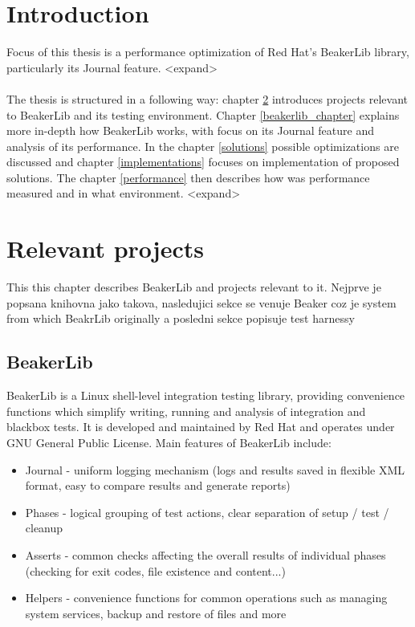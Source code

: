 
\chapter{Introduction}

Focus of this thesis is a performance optimization of Red Hat's BeakerLib library, particularly its Journal feature. <expand>
\\
\\
The thesis is structured in a following way: chapter \ref{relevant_projects} introduces projects relevant to BeakerLib and its testing environment. Chapter \ref{beakerlib_chapter} explains more in-depth how BeakerLib works, with focus on its Journal feature and analysis of its performance. In the chapter \ref{solutions} possible optimizations are discussed and chapter \ref{implementations} focuses on implementation of proposed solutions. The chapter \ref{performance} then describes how was performance measured and in what environment. <expand>

\chapter{Relevant projects}
\label{relevant_projects}

This this chapter describes BeakerLib and projects relevant to it. Nejprve je popsana knihovna jako takova, nasledujici sekce se venuje Beaker coz je system from which BeakrLib originally  a posledni sekce popisuje test harnessy

\section{BeakerLib}

BeakerLib is a Linux shell-level integration testing library, providing convenience functions which simplify writing, running and analysis of integration and blackbox tests. \cite{beakerlib_wiki}
It is developed and maintained by Red Hat and operates under GNU General Public License.
Main features of BeakerLib include:
\begin{itemize}
\item Journal - uniform logging mechanism (logs and results saved in flexible XML format, easy to compare results and generate reports)
\item Phases - logical grouping of test actions, clear separation of setup / test / cleanup
\item Asserts - common checks affecting the overall results of individual phases (checking for exit codes, file existence and content...)
\item Helpers - convenience functions for common operations such as managing system services, backup and restore of files and more
\end{itemize}


